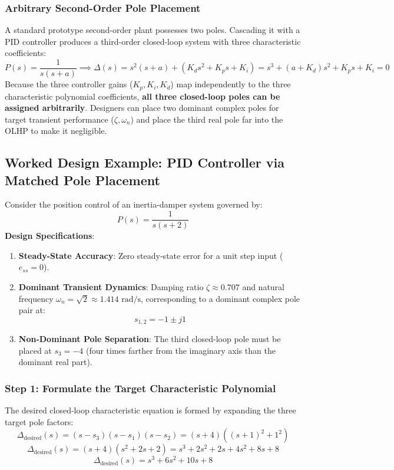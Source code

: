 \documentclass[12pt,onecolumn,twoside ]{article}
\begin{document}
	\subsubsection{Arbitrary Second-Order Pole Placement}
	A standard prototype second-order plant possesses two poles. Cascading it with a PID controller produces a third-order closed-loop system with three characteristic coefficients: \[
	P(s) = \frac{1}{s(s + a)} \implies \Delta(s) = s^2(s + a) + (K_d s^2 + K_p s + K_i) = s^3 + (a + K_d)s^2 + K_p s + K_i = 0
	\]
	Because the three controller gains ($K_p, K_i, K_d$) map independently to the three characteristic polynomial coefficients, \textbf{all three closed-loop poles can be assigned arbitrarily}. Designers can place two dominant complex poles for target transient performance ($\zeta, \omega_n$) and place the third real pole far into the OLHP to make it negligible.
	
	\subsection{Worked Design Example: PID Controller via Matched Pole Placement}
	Consider the position control of an inertia-damper system governed by: \[
	P(s) = \frac{1}{s(s + 2)}
	\] \textbf{Design Specifications}:
	\begin{enumerate}
		\item
		\textbf{Steady-State Accuracy}: Zero steady-state error for a unit step input ($e_{ss} = 0$).
		\item
		\textbf{Dominant Transient Dynamics}: Damping ratio $\zeta \approx 0.707$ and natural frequency $\omega_n = \sqrt{2} \approx 1.414\text{ rad/s}$, corresponding to a dominant complex pole pair at: \[
		s_{1,2} = -1 \pm j1
		\]
		\item
		\textbf{Non-Dominant Pole Separation}: The third closed-loop pole must be placed at $s_3 = -4$ (four times farther from the imaginary axis than the dominant real part).
	\end{enumerate}
	\subsubsection{Step 1: Formulate the Target Characteristic Polynomial}
	The desired closed-loop characteristic equation is formed by expanding the three target pole factors: \[
	\Delta_{\text{desired}}(s) = (s - s_3)(s - s_1)(s - s_2) = (s + 4)\left( (s + 1)^2 + 1^2 \right)
	\] \[
	\Delta_{\text{desired}}(s) = (s + 4)(s^2 + 2s + 2) = s^3 + 2s^2 + 2s + 4s^2 + 8s + 8
	\] \[
	\Delta_{\text{desired}}(s) = s^3 + 6s^2 + 10s + 8
	\]
\end{document}
